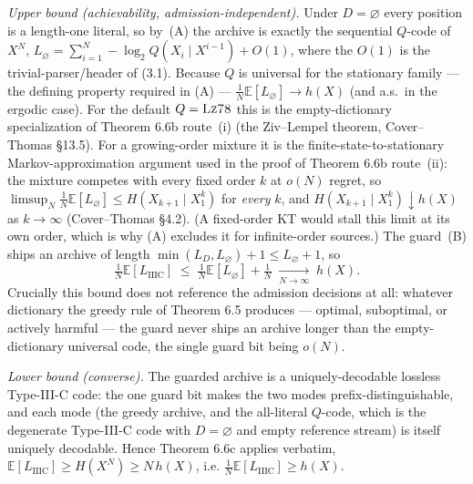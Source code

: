 \documentclass[
]{article}
\begin{document}
\emph{Upper bound (achievability, admission-independent).} Under
$D = \varnothing$ every position is a length-one literal, so by~(A) the
archive is exactly the sequential $Q$-code of $X^N$,
$L_\varnothing = \sum_{i=1}^{N} -\log_2 Q(X_i \mid X^{i-1}) + O(1)$,
where the $O(1)$ is the trivial-parser/header of (3.1). Because $Q$ is
universal for the stationary family --- the defining property required in
(A) --- $\tfrac{1}{N}\mathbb{E}[L_\varnothing] \to h(X)$ (and a.s.\ in the
ergodic case). For the default $Q = \textsc{Lz78}$ this is the
empty-dictionary specialization of Theorem 6.6b route~(i) (the
Ziv--Lempel theorem, Cover--Thomas \S13.5). For a growing-order mixture
it is the finite-state-to-stationary Markov-approximation argument used in
the proof of Theorem 6.6b route~(ii): the mixture competes with every
fixed order $k$ at $o(N)$ regret, so $\limsup_N
\tfrac{1}{N}\mathbb{E}[L_\varnothing] \le H(X_{k+1}\mid X_1^k)$ for
\emph{every} $k$, and $H(X_{k+1}\mid X_1^k) \downarrow h(X)$ as
$k\to\infty$ (Cover--Thomas \S4.2). (A fixed-order KT would stall this
limit at its own order, which is why (A) excludes it for infinite-order
sources.) The guard~(B) ships an archive of
length $\min(L_D, L_\varnothing) + 1 \le L_\varnothing + 1$, so
\[
\tfrac{1}{N}\mathbb{E}[L_{\mathrm{IIIC}}]
\;\le\; \tfrac{1}{N}\mathbb{E}[L_\varnothing] + \tfrac{1}{N}
\;\xrightarrow[N\to\infty]{}\; h(X).
\]
Crucially this bound does not reference the admission decisions at all:
whatever dictionary the greedy rule of Theorem 6.5 produces --- optimal,
suboptimal, or actively harmful --- the guard never ships an archive
longer than the empty-dictionary universal code, the single guard bit
being $o(N)$.

\emph{Lower bound (converse).} The guarded archive is a
uniquely-decodable lossless Type-III-C code: the one guard bit makes the
two modes prefix-distinguishable, and each mode (the greedy archive, and
the all-literal $Q$-code, which is the degenerate Type-III-C code with
$D=\varnothing$ and empty reference stream) is itself uniquely decodable.
Hence Theorem 6.6c applies verbatim,
$\mathbb{E}[L_{\mathrm{IIIC}}] \ge H(X^N) \ge N\,h(X)$, i.e.
$\tfrac{1}{N}\mathbb{E}[L_{\mathrm{IIIC}}] \ge h(X)$.
\end{document}
